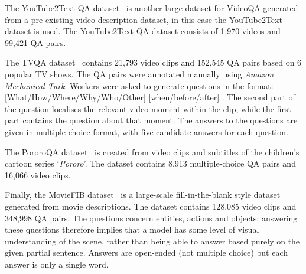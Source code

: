 \documentclass[../interim.tex]{subfiles}
\begin{document}
The YouTube2Text-QA dataset~\cite{dataset:youtube2text-qa} is another large dataset for VideoQA generated from a pre-existing video description dataset, in this case the YouTube2Text~\cite{dataset:youtube2text} dataset is used. The YouTube2Text-QA dataset consists of 1,970 videos and 99,421 QA pairs.

The TVQA dataset~\cite{dataset:tvqa} contains 21,793 video clips and 152,545 QA pairs based on 6 popular TV shows. The QA pairs were annotated manually using \textit{Amazon Mechanical Turk}. Workers were asked to generate questions in the format: [What/How/Where/Why/Who/Other] \underline{\hspace{1cm}} [when/before/after] \underline{\hspace{1cm}}. The second part of the question localises the relevant video moment within the clip, while the first part contains the question about that moment. The answers to the questions are given in multiple-choice format, with five candidate answers for each question.

The PororoQA dataset~\cite{dataset:pororo-qa} is created from video clips and subtitles of the children's cartoon series `\textit{Pororo}'. The dataset contains 8,913 multiple-choice QA pairs and 16,066 video clips.

Finally, the MovieFIB dataset~\cite{dataset:movie-fib} is a large-scale fill-in-the-blank style dataset generated from movie descriptions. The dataset contains 128,085 video clips and 348,998 QA pairs. The questions concern entities, actions and objects; answering these questions therefore implies that a model has some level of visual understanding of the scene, rather than being able to answer based purely on the given partial sentence. Answers are open-ended (not multiple choice) but each answer is only a single word.
\end{document}
